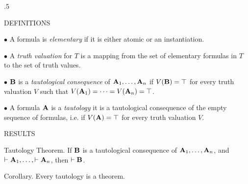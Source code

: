 \vglue .5\baselineskip 

\beginsection DEFINITIONS

\item{$\bullet$} A formula is {\it elementary} if it is either atomic or an instantiation.

\item{$\bullet$} A {\it truth valuation} for $T$ is a mapping from the set of elementary 
formulas in $T$ to the set of truth values.

\item{$\bullet$} ${\bf B}$ is a {\it tautological consequence} of ${\bf A}_1, \dots , {\bf A}_n$ 
if $V({\bf B}) = \top$ for every truth valuation $V$ such that 
$V({\bf A}_1) = \cdots = V({\bf A}_n) = \top$.

\item{$\bullet$} A formula ${\bf A}$ is a {\it tautology} it is a tautological consequence of 
the empty sequence of formulas, i.e. if $V({\bf A}) = \top$ for every truth valuation $V$.

\beginsection RESULTS

\proclaim Tautology Theorem. If ${\bf B}$ is a tautological consequence of ${\bf A}_1, \dots, {\bf A}_n$,
and $\vdash{\bf A}_1, \dots, \vdash {\bf A}_n$, then $\vdash {\bf B}$.

\proclaim Corollary. Every tautology is a theorem.

\vfill
\break
